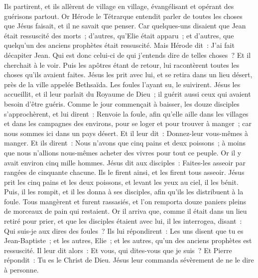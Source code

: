 \begin{multicols}{2}
Ils partirent, et ils allèrent de village en village, évangélisant et opérant des guérisons partout.
Or Hérode le Tétrarque entendit parler de toutes les choses que Jésus faisait, et il ne savait que penser. Car quelques-uns disaient que Jean était ressuscité des morts~;
d'autres, qu'Elie était apparu~; et d'autres, que quelqu'un des anciens prophètes était ressuscité.
Mais Hérode dit~: J'ai fait décapiter Jean. Qui est donc celui-ci de qui j'entends dire de telles choses~? Et il cherchait à le voir.
Puis les apôtres étant de retour, lui racontèrent toutes les choses qu'ils avaient faites. Jésus les prit avec lui, et se retira dans un lieu désert, près de la ville appelée Bethsaïda.
Les foules l'ayant su, le suivirent. Jésus les accueillit, et il leur parlait du Royaume de Dieu~; il guérit aussi ceux qui avaient besoin d'être guéris.
Comme le jour commençait à baisser, les douze disciples s'approchèrent, et lui dirent~: Renvoie la foule, afin qu'elle aille dans les villages et dans les campagnes des environs, pour se loger et pour trouver à manger~; car nous sommes ici dans un pays désert.
Et il leur dit~: Donnez-leur vous-mêmes à manger. Et ils dirent~: Nous n'avons que cinq pains et deux poissons~; à moins que nous n'allions nous-mêmes acheter des vivres pour tout ce peuple.
Or il y avait environ cinq mille hommes. Jésus dit aux disciples~: Faites-les asseoir par rangées de cinquante chacune.
Ils le firent ainsi, et les firent tous asseoir.
Jésus prit les cinq pains et les deux poissons, et levant les yeux au ciel, il les bénit. Puis, il les rompit, et il les donna à ses disciples, afin qu'ils les distribuent à la foule.
Tous mangèrent et furent rassasiés, et l'on remporta douze paniers pleins de morceaux de pain qui restaient.
Or il arriva que, comme il était dans un lieu retiré pour prier, et que les disciples étaient avec lui, il les interrogea, disant~: Qui suis-je aux dires des foules~?
Ils lui répondirent~: Les uns disent que tu es Jean-Baptiste~; et les autres, Elie~; et les autres, qu'un des anciens prophètes est ressuscité.
Il leur dit alors~: Et vous, qui dites-vous que je suis~? Et Pierre répondit~: Tu es le Christ de Dieu.
Jésus leur commanda sévèrement de ne le dire à personne.

\end{multicols}
